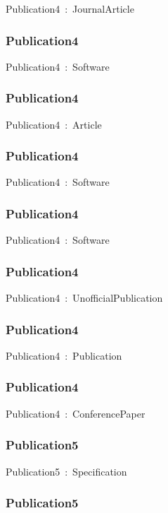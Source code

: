 \documentclass{article}
\begin{document}
Publication4~:~JournalArticle

\subsubsection*{Publication4}

Publication4~:~Software

\subsubsection*{Publication4}

Publication4~:~Article

\subsubsection*{Publication4}

Publication4~:~Software

\subsubsection*{Publication4}

Publication4~:~Software

\subsubsection*{Publication4}

Publication4~:~UnofficialPublication

\subsubsection*{Publication4}

Publication4~:~Publication

\subsubsection*{Publication4}

Publication4~:~ConferencePaper

\subsubsection*{Publication5}

Publication5~:~Specification

\subsubsection*{Publication5}
\end{document}
